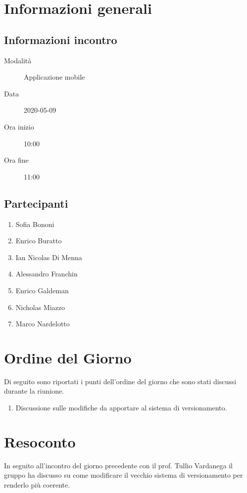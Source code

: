 \documentclass{article}
\begin{document}


\section{Informazioni generali}%
\label{sec:informazioni_generali}

\subsection{Informazioni incontro}%
\label{sub:informazioni_incontro}

\begin{description}
  \item[Modalità] Applicazione mobile 
  \item[Data] 2020-05-09
  \item[Ora inizio] 10:00
  \item[Ora fine] 11:00
\end{description}

\subsection{Partecipanti}%
\label{sub:partecipanti}

\begin{enumerate}
  \item Sofia Bononi
  \item Enrico Buratto
  \item Ian Nicolas Di Menna
  \item Alessandro Franchin
  \item Enrico Galdeman
  \item Nicholas Miazzo
  \item Marco Nardelotto
\end{enumerate}

\section{Ordine del Giorno}%
\label{ordine_del_giorno}
Di seguito sono riportati i punti dell'ordine del giorno che sono stati discussi durante la riunione.
\begin{enumerate}
  \item Discussione sulle modifiche da apportare al sistema di versionamento.
\end{enumerate}

\section{Resoconto}%
\label{resoconto}
In seguito all'incontro del giorno precedente con il prof. Tullio Vardanega il gruppo ha discusso su come modificare il vecchio sistema di versionamento per renderlo più coerente.
\end{document}
